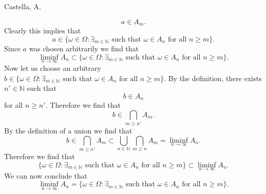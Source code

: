 \begin{solution}[2.3]{Castella, A.}
\begin{itemize}
        $$
            a \in A_m.
        $$
        Clearly this implies that
        $$
            a\in \{\omega\in\Omega:\exists_{m\in\mathbb{N}}\text{ such that }\omega\in A_n\text{ for all }n\geq m\}.
        $$
        Since $a$ was chosen arbitrarily we find that
        $$
            \liminf_{n\rightarrow\infty}A_n \subset \{\omega\in\Omega:\exists_{m\in\mathbb{N}}\text{ such that }\omega\in A_n\text{ for all }n\geq m\}.
        $$
        Now let us choose an arbitrary $b \in \{\omega\in\Omega:\exists_{m\in\mathbb{N}}\text{ such that }\omega\in A_n\text{ for all }n\geq m\}$. By the definition, there exists $n' \in \mathbb{N}$ such that
        $$
            b \in A_n
        $$
        for all $n \geq n'$. Therefore we find that
        $$
            b \in \bigcap_{m\geq n'}A_m.
        $$
        By the definition of a union we find that
        $$
            b\in \bigcap_{m\geq n'}A_m \subset \bigcup_{n\in\mathbb{N}}\bigcap_{m\geq n}A_m = \liminf_{n\rightarrow\infty}A_n.
        $$
        Therefore we find that
        $$
            \{\omega\in\Omega:\exists_{m\in\mathbb{N}}\text{ such that }\omega\in A_n\text{ for all }n\geq m\} \subset \liminf_{n\rightarrow\infty}A_n.
        $$
        We can now conclude that
        $$
            \liminf_{n\rightarrow\infty}A_n = \{\omega\in\Omega:\exists_{m\in\mathbb{N}}\text{ such that }\omega\in A_n\text{ for all }n\geq m\}.
        $$
    \end{itemize}
\end{solution}

